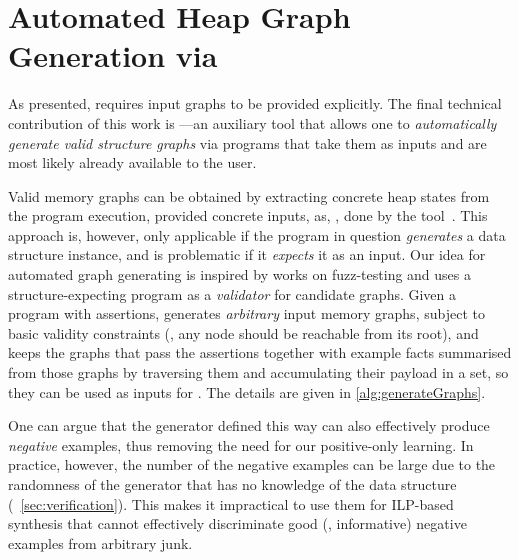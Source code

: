 \vspace{-5pt}

\section{Automated Heap Graph Generation via \ggen}
\label{sec:generator}


As presented, \tool requires input graphs to be provided explicitly.
%
The final technical contribution of this work is \ggen---an auxiliary
tool that allows one to \emph{automatically generate valid structure
  graphs} via programs that take them as inputs and are most likely
already available to the user.

Valid memory graphs can be obtained by extracting concrete
heap states from the program execution, provided concrete inputs, as,
\eg, done by the \sling tool~\cite{le2019sling}.
%
This approach is, however, only applicable if the program in question
\emph{generates} a data structure instance, and is problematic if it
\emph{expects} it as an input.
%
Our idea for automated graph generating is inspired by works on
fuzz-testing and uses a structure-expecting program as a
\emph{validator} for candidate graphs.
%
Given a program with assertions, \ggen generates \emph{arbitrary}
input memory graphs, subject to basic validity constraints (\eg, any
node should be reachable from its root), and keeps the graphs that
pass the assertions together with example facts summarised from those
graphs by traversing them and accumulating their payload in a set, so
they can be used as inputs for \tool.
%
The details are given in \autoref{alg:generateGraphs}.

One can argue that the generator defined this way can also effectively
produce \emph{negative} examples, thus removing the need for our
positive-only learning.
%
In practice, however, the number of the negative examples can be large
due to the randomness of the generator that has no knowledge of the
data structure (\cf~\autoref{sec:verification}). This makes it
impractical to use them for ILP-based synthesis that cannot
effectively discriminate good (\ie, informative) negative examples
from arbitrary junk.


